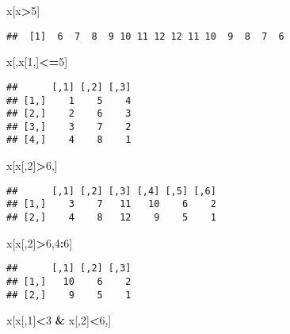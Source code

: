 \documentclass[]{article}
\newenvironment{Shaded}{\begin{snugshade}}{\end{snugshade}}
\newcommand{\DecValTok}[1]{\textcolor[rgb]{0.00,0.00,0.81}{#1}}
\newcommand{\StringTok}[1]{\textcolor[rgb]{0.31,0.60,0.02}{#1}}
\newcommand{\OperatorTok}[1]{\textcolor[rgb]{0.81,0.36,0.00}{\textbf{#1}}}
\newcommand{\NormalTok}[1]{#1}
\begin{document}
\begin{Shaded}
\begin{Highlighting}[]
\NormalTok{x[x}\OperatorTok{>}\DecValTok{5}\NormalTok{]}
\end{Highlighting}
\end{Shaded}

\begin{verbatim}
##  [1]  6  7  8  9 10 11 12 12 11 10  9  8  7  6
\end{verbatim}

\begin{Shaded}
\begin{Highlighting}[]
\NormalTok{x[,x[}\DecValTok{1}\NormalTok{,]}\OperatorTok{<=}\DecValTok{5}\NormalTok{]}
\end{Highlighting}
\end{Shaded}

\begin{verbatim}
##      [,1] [,2] [,3]
## [1,]    1    5    4
## [2,]    2    6    3
## [3,]    3    7    2
## [4,]    4    8    1
\end{verbatim}

\begin{Shaded}
\begin{Highlighting}[]
\NormalTok{x[x[,}\DecValTok{2}\NormalTok{]}\OperatorTok{>}\DecValTok{6}\NormalTok{,]}
\end{Highlighting}
\end{Shaded}

\begin{verbatim}
##      [,1] [,2] [,3] [,4] [,5] [,6]
## [1,]    3    7   11   10    6    2
## [2,]    4    8   12    9    5    1
\end{verbatim}

\begin{Shaded}
\begin{Highlighting}[]
\NormalTok{x[x[,}\DecValTok{2}\NormalTok{]}\OperatorTok{>}\DecValTok{6}\NormalTok{,}\DecValTok{4}\OperatorTok{:}\DecValTok{6}\NormalTok{]}
\end{Highlighting}
\end{Shaded}

\begin{verbatim}
##      [,1] [,2] [,3]
## [1,]   10    6    2
## [2,]    9    5    1
\end{verbatim}

\begin{Shaded}
\begin{Highlighting}[]
\NormalTok{x[x[,}\DecValTok{1}\NormalTok{]}\OperatorTok{<}\DecValTok{3} \OperatorTok{&}\StringTok{ }\NormalTok{x[,}\DecValTok{2}\NormalTok{]}\OperatorTok{<}\DecValTok{6}\NormalTok{,]}
\end{Highlighting}
\end{Shaded}
\end{document}

